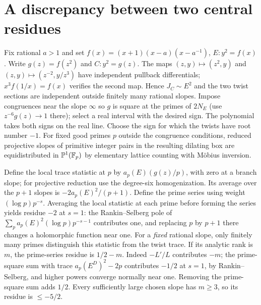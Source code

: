 \documentclass[11pt]{article}
\begin{document}
\section{A discrepancy between two central residues}
Fix rational $a>1$ and set $f(x)=(x+1)(x-a)(x-a^{-1})$, $E:y^2=f(x)$. Write $g(z)=f(z^2)$ and $C:y^2=g(z)$. The maps $(z,y)\mapsto(z^2,y)$ and $(z,y)\mapsto(z^{-2},y/z^3)$ have independent pullback differentials; $x^3 f(1/x)=f(x)$ verifies the second map. Hence $J_C\sim E^2$ and the two twist sections are independent outside finitely many rational slopes. Impose congruences near the slope $\infty$ so $g$ is square at the primes of $2N_E$ (use $z^{-6}g(z)\to1$ there); select a real interval with the desired sign. The polynomial takes both signs on the real line. Choose the sign for which the twists have root number $-1$. For fixed good primes $p$ outside the congruence conditions, reduced projective slopes of primitive integer pairs in the resulting dilating box are equidistributed in $\mathbb P^1(\mathbb F_p)$ by elementary lattice counting with M\"obius inversion.

Define the local trace statistic at $p$ by $a_p(E)(g(z)/p)$, with zero at a branch slope; for projective reduction use the degree-six homogenization. Its average over the $p+1$ slopes is $-2a_p(E)^2/(p+1)$. Define the prime series using weight $(\log p)p^{-s}$. Averaging the local statistic at each prime before forming the series yields residue $-2$ at $s=1$: the Rankin--Selberg pole of $\sum_p a_p(E)^2(\log p)p^{-s-1}$ contributes one, and replacing $p$ by $p+1$ there changes a holomorphic function near one. For a \emph{fixed} rational slope, only finitely many primes distinguish this statistic from the twist trace. If its analytic rank is $m$, the prime-series residue is $1/2-m$. Indeed $-L'/L$ contributes $-m$; the prime-square sum with trace $a_p(E^D)^2-2p$ contributes $-1/2$ at $s=1$, by Rankin--Selberg, and higher powers converge normally near one. Removing the prime-square sum adds $1/2$. Every sufficiently large chosen slope has $m\ge3$, so its residue is $\le-5/2$.
\end{document}
